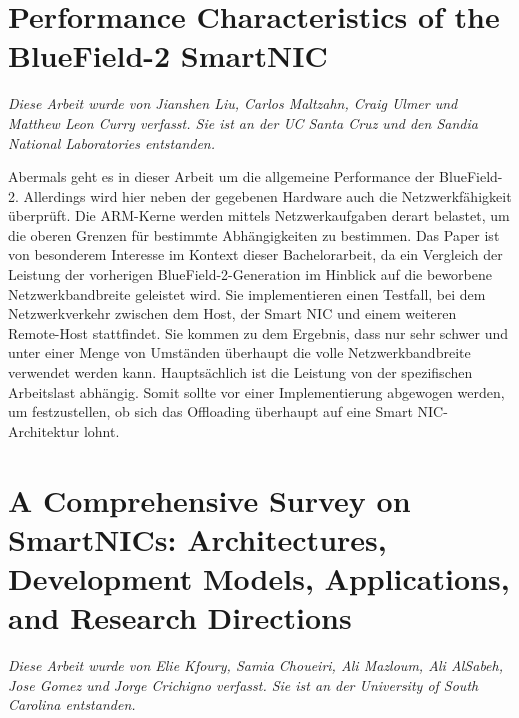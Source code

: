 \section{Performance Characteristics of the BlueField-2 SmartNIC}
\textit{Diese Arbeit wurde von Jianshen Liu, Carlos Maltzahn, Craig Ulmer und Matthew Leon Curry verfasst. Sie ist an der UC Santa Cruz und den Sandia National Laboratories entstanden.}

Abermals geht es in dieser Arbeit um die allgemeine Performance der BlueField-2. Allerdings wird hier neben der gegebenen Hardware auch die Netzwerkfähigkeit überprüft. Die ARM-Kerne werden mittels Netzwerkaufgaben derart belastet, um die oberen Grenzen für bestimmte Abhängigkeiten zu bestimmen. Das Paper ist von besonderem Interesse im Kontext dieser Bachelorarbeit, da ein Vergleich der Leistung der vorherigen BlueField-2-Generation im Hinblick auf die beworbene Netzwerkbandbreite geleistet wird. Sie implementieren einen Testfall, bei dem Netzwerkverkehr zwischen dem Host, der Smart NIC und einem weiteren Remote-Host stattfindet. Sie kommen zu dem Ergebnis, dass nur sehr schwer und unter einer Menge von Umständen überhaupt die volle Netzwerkbandbreite verwendet werden kann. Hauptsächlich ist die Leistung von der spezifischen Arbeitslast abhängig. Somit sollte vor einer Implementierung abgewogen werden, um festzustellen, ob sich das Offloading überhaupt auf eine Smart NIC-Architektur lohnt.
\section{A Comprehensive Survey on SmartNICs: Architectures, Development Models, Applications, and Research Directions}
\textit{Diese Arbeit wurde von Elie Kfoury, Samia Choueiri, Ali Mazloum, Ali AlSabeh, Jose Gomez und Jorge Crichigno verfasst. Sie ist an der University of South Carolina entstanden.}

